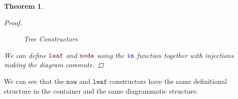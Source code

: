 \documentclass[twoside,11pt,openright]{report}
\theoremstyle{plain} %
\newtheorem{thm}{Theorem}[section]
\theoremstyle{definition}
\theoremstyle{remark}
\newcommand*{\type}[1]{\textcolor{magenta!90!black}{#1}}
\newcommand*{\universe}[1]{\textcolor{orange!80!black}{#1}}
\newcommand*{\function}[1]{\textcolor{blue!60!black}{\ensuremath{\mathtt{#1}}}}
\newcommand*{\constructor}[1]{\textcolor{purple!60!black}{\ensuremath{\mathtt{#1}}}}
\newcommand*{\typeformer}[1]{\ensuremath{\mathtt{#1}}}
\begin{document}
\begin{thm}
\begin{proof}
\begin{figure}[h]
  \centering
  \caption{Tree Constructors}
  \label{fig:tree-constructors}
\end{figure}
We can define \(\constructor{leaf}\) and \(\constructor{node}\) using the \(\function{in}\) function together with injections making the diagram commute. 
\end{proof}
\end{thm}
\noindent We can see that the \constructor{now} and \constructor{leaf} constructors have the same definitional structure in the container and the same diagrammatic structure.
\end{document}
